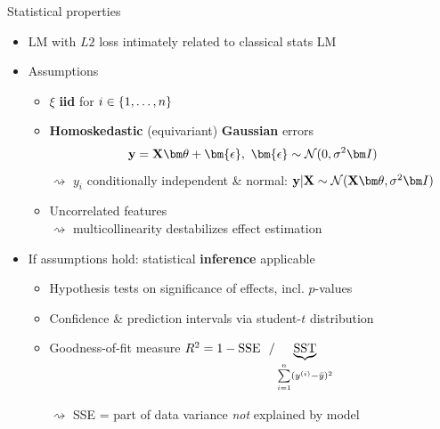 \documentclass[11pt,compress,t,notes=noshow, xcolor=table]{beamer}
\begin{document}
\begin{vbframe}{Statistical properties}

\begin{itemize}
    \item LM with $L2$ loss intimately related to classical stats LM
    \item Assumptions
    \begin{itemize}
        \item $\xi$ \textbf{iid} for $i \in \{1, \ldots, n\}$
        \item \textbf{Homoskedastic} (equivariant) 
         \textbf{Gaussian} errors
        $$\yv = \Xmat \thetav + \bm{\epsilon}, ~ \bm{\epsilon} \sim 
        \normal(0, \sigma^2 \id)  $$
        $\rightsquigarrow$ $y_i$ conditionally independent \& normal:
        $\yv | \Xmat \sim \normal(\Xmat \thetav, \sigma^2 \id)$
        \item Uncorrelated features \\$\rightsquigarrow$ 
        multicollinearity destabilizes effect estimation 
    \end{itemize}
    \item If assumptions hold: statistical \textbf{inference} applicable
    \begin{itemize}
            \item Hypothesis tests on significance of effects, incl. $p$-values
            \item Confidence \& prediction intervals via student-$t$ 
            distribution
        \item Goodness-of-fit measure
        $R^2 = 1 - \text{SSE} ~~ / \underbrace{\text{SST}}_{
        \sum\limits_{i=1}^n (y^{(i)} - \bar y)^2}$
        
        $\rightsquigarrow$ SSE = part of data variance \textit{not} explained 
        by model
    \end{itemize}
\end{itemize}

\end{vbframe}

\endlecture
\end{document}
